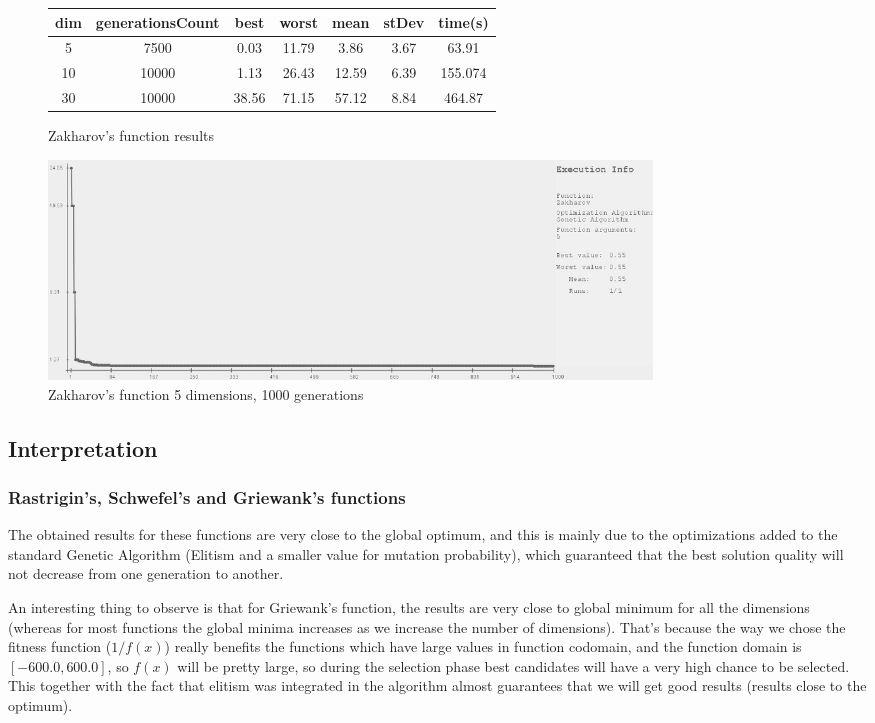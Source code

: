 \documentclass[a4paper]{article}
\begin{document}
	\begin{figure}[!h]
		\centering
		\begin{tabular}{|| c | c | c | c | c | c | c ||}
			\hline
			dim & generationsCount & best & worst & mean & stDev & time(s) \\ \hline \hline
			5 & 7500 & 0.03 & 11.79 & 3.86 & 3.67 & 63.91 \\ \hline
			10 & 10000 & 1.13 & 26.43 & 12.59 & 6.39 & 155.074 \\ \hline
			30 & 10000 & 38.56 & 71.15 & 57.12 & 8.84 & 464.87 \\ \hline
		\end{tabular}
		\caption{Zakharov's function results}
	\end{figure}
	
	\begin{figure}[!h]
		\centering
		\includegraphics[width=16cm]{zakharov_5_1000.JPG}
		\caption{Zakharov's function 5 dimensions, 1000 generations}
	\end{figure}
	
	\subsection{Interpretation}
	
	\subsubsection{Rastrigin's, Schwefel's and Griewank's functions}
	
	The obtained results for these functions are very close to the global optimum, and this is mainly due to the optimizations added to the standard Genetic Algorithm (Elitism and a smaller value for mutation probability), which guaranteed that the best solution quality will not decrease from one generation to another.
	
	An interesting thing to observe is that for Griewank's function, the results are very close to global minimum for all the dimensions (whereas for most functions the global minima increases as we increase the number of dimensions). That's because the way we chose the fitness function ($1 / f(x)$) really benefits the functions which have large values in function codomain, and the function domain is $\left[ -600.0, 600.0 \right]$, so $f(x)$ will be pretty large, so during the selection phase best candidates will have a very high chance to be selected. This together with the fact that elitism was integrated in the algorithm almost guarantees that we will get good results (results close to the optimum).
	
\end{document}
